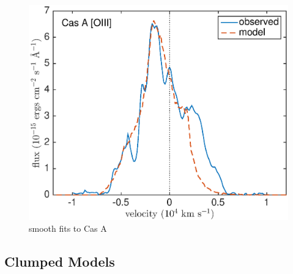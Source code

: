 \begin{figure}
\centering
\includegraphics[scale=0.4,clip=true, trim=20 0 40 20]{chapters/chapter6/figs/CasA/CasA_OIII}
\caption{smooth fits to Cas A}
\label{CasA}
\end{figure}

\subsection{Clumped Models}

